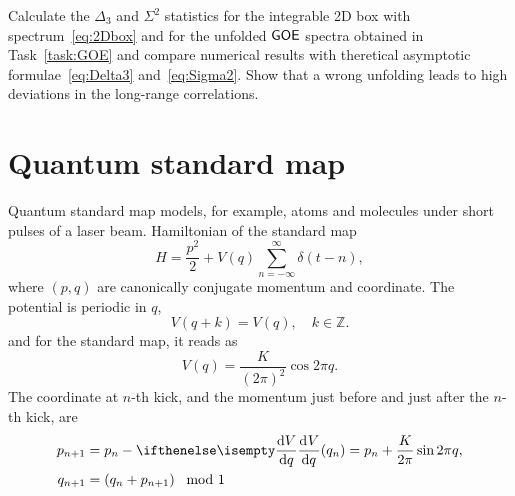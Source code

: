 \documentclass[a4paper,11pt,twoside]{article}
\begin{document}
    \begin{task}
        Calculate the $\Delta_{3}$ and $\Sigma^{2}$ statistics for the integrable 2D box with spectrum~\eqref{eq:2Dbox} and for the unfolded $\mathsf{GOE}$ spectra obtained in Task~\ref{task:GOE} and compare numerical results with theretical asymptotic formulae~\eqref{eq:Delta3} and~\eqref{eq:Sigma2}.
        Show that a wrong unfolding leads to high deviations in the long-range correlations.
    \end{task}

\section{Quantum standard map}
    Quantum standard map models, for example, atoms and molecules under short pulses of a laser beam.
    Hamiltonian of the standard map
    \begin{equation}
        H=\frac{p^{2}}{2}+V(q)\sum_{n=-\infty}^{\infty}\delta(t-n),
    \end{equation}
    where $(p,q)$ are canonically conjugate momentum and coordinate.
    The potential is periodic in $q$,
    \begin{equation}
        V(q+k)=V(q),\quad k\in\mathbb{Z}.
    \end{equation}
    and for the standard map, it reads as
    \begin{equation}
        V(q)=\frac{K}{(2\pi)^{2}}\cos{2\pi q}.
    \end{equation}
    The coordinate at $n$-th kick, and the momentum just before and just after the $n$-th kick, are
    \begin{subequations}
        \begin{align}
            p_{n+1}&=p_{n}-\derivative{V}{q}(q_{n})=p_{n}+\frac{K}{2\pi}\sin{2\pi q},\\
            q_{n+1}&=\left(q_{n}+p_{n+1}\right)\mod{1}
        \end{align}
    \end{subequations}
\end{document}
